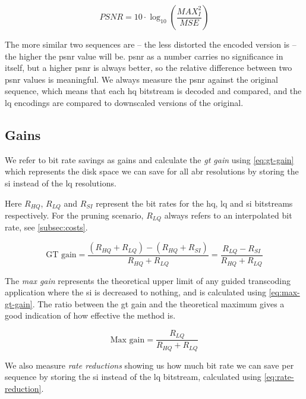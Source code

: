 \begin{equation}
\label{eq:psnr}
PSNR = 10 \cdot \log_{10} \left( \frac{\mathit{MAX}_I^2}{\mathit{MSE}} \right)
\end{equation}

The more similar two sequences are -- the less distorted the encoded version is -- the higher the \gls{psnr} value will be. \gls{psnr} as a number carries no significance in itself, but a higher \gls{psnr} is always better, so the relative difference between two \gls{psnr} values is meaningful. We always measure the \gls{psnr} against the original sequence, which means that each \gls{hq} bitstream is decoded and compared, and the \gls{lq} encodings are compared to downscaled versions of the original.


\subsection{Gains}
We refer to bit rate savings as gains and calculate the \textit{\gls{gt} gain} using \cref{eq:gt-gain} which represents the disk space we can save for all \gls{abr} resolutions by storing the \gls{si} instead of the \gls{lq} resolutions.

Here $R_{HQ}$, $R_{LQ}$ and $R_{SI}$ represent the bit rates for the \gls{hq}, \gls{lq} and \gls{si} bitstreams respectively. For the pruning scenario, $R_{LQ}$ always refers to an interpolated bit rate, see \cref{subsec:costs}.

\begin{equation}
\label{eq:gt-gain}
\text{GT gain} = \frac{(R_{HQ} + R_{LQ}) - (R_{HQ} + R_{SI})}{R_{HQ} + R_{LQ}} = \frac{R_{LQ} - R_{SI}}{R_{HQ} + R_{LQ}}
\end{equation}
\vspace{0.2em}

The \textit{max gain} represents the theoretical upper limit of any guided transcoding application where the \gls{si} is decreased to nothing, and is calculated using \cref{eq:max-gt-gain}. The ratio between the \gls{gt} gain and the theoretical maximum gives a good indication of how effective the method is.

\begin{equation}
\label{eq:max-gt-gain}
\text{Max gain} = \frac{R_{LQ}}{R_{HQ} + R_{LQ}}
\end{equation}
\vspace{0.2em}

We also measure \textit{rate reductions} showing us how much bit rate we can save per sequence by storing the \gls{si} instead of the \gls{lq} bitstream, calculated using \cref{eq:rate-reduction}.

